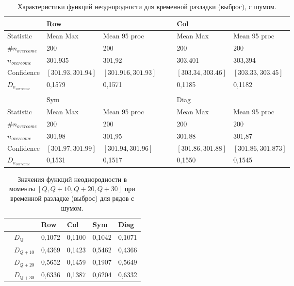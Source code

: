 \documentclass[specialist, substylefile = spbu.rtx,
			   subf, href, 12pt]{disser}
\begin{document}
\newpage
\begin{table}[!hhh]
	\center
	\small
	\caption{Характеристики функций неоднородности для временной разладки (выброс), с шумом.}
	\begin{tabular}{l|lll|lll}
		 				   & Row		  	  & 			 &&  & 	Col	      & 			      \\
		 				   \hline
		 Statistic        & Mean Max 	  & Mean 95 proc && 	& Mean Max     & Mean 95 proc     \\
		 $\#n_{overcome}$ & 200 	  	  & 200 		 &&     & 200 	      & 200 			  \\
		 $n_{overcome}$   & 301,935   	  & 301,92      &&     & 303,401       & 303,394		  \\
		 Confidence       & $[301.93, 301.94]$& $[301.916, 301.93]$&&     & $[303.34, 303.46]$ & $[303.33, 303.45]$     \\
		$D_{n_{overcome}}$& 0,1579	  &	0,1571		 &&     & 0,1185  &   0,1182        \\
		&&&&&&\\
		  				   & Sym		  	  & 			 && & 	Diag	      & 			      \\
		  				  \hline
		 Statistic        & Mean Max 	  & Mean 95 proc && 	& Mean Max     & Mean 95 proc     \\
		 $\#n_{overcome}$ & 200 	  	  & 200 		 &&     & 200 	      & 200 			  \\
		 $n_{overcome}$   & 301,98   	  & 301,95      &&     & 301,88      & 301,87 		  \\
		 Confidence       & $[301.97, 301.99]$ & $[301.94, 301.96]$ &&     & $[301.86, 301.88]$ & $[301.86, 301.873]$     \\
		$D_{n_{overcome}}$& 0,1531		  &	0,1517		 &&     & 0,1550		 & 0,1545          \\
	\end{tabular}
	\label{tab:TemporaryHeterogeneityNoisedOutlier}
\end{table}

\begin{table}[!hhh]
	\center
	\caption{Значения функций неоднородности в моменты $[Q, Q+10, Q+20, Q+30]$ при временной разладке  (выброс) для рядов с шумом.}
	\begin{tabular}{ll|llll}
		&              & Row 	  & Col 	& Sym    & Diag  \\
		\hline
		& $D_Q$        & 0,1072	  & 0,1100 	& 0,1042 & 0,1071		\\
		& $D_{Q+10}$   & 0,4369   & 0,1423  & 0,5462 & 0,4366	\\
		& $D_{Q+20}$   & 0,5652   & 0,1459  & 0,1907 & 0,5649	\\
		& $D_{Q+30}$   & 0,6336	  &	0,1387	& 0,6204 & 0,6332	
	\end{tabular}
	\label{tab:TemporaryHeterogeneityNoisedOutlierValues}
\end{table}
\end{document}
